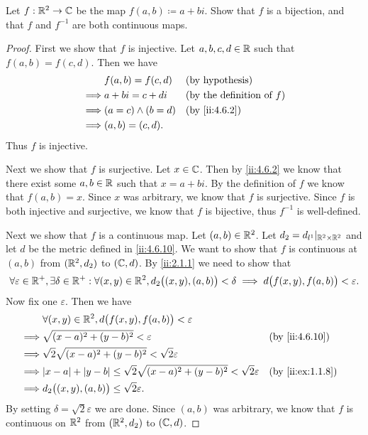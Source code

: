 \begin{ex}\label{ii:ex:4.6.11}
  Let \(f : \mathbb{R}^2 \to \mathbb{C}\) be the map \(f(a, b) \coloneqq a + bi\).
  Show that \(f\) is a bijection, and that \(f\) and \(f^{-1}\) are both continuous maps.
\end{ex}

\begin{proof}
  First we show that \(f\) is injective.
  Let \(a, b, c, d \in \mathbb{R}\) such that \(f(a, b) = f(c, d)\).
  Then we have
  \begin{align*}
             & f(a, b) = f(c, d)     &  & \text{(by hypothesis)}              \\
    \implies & a + bi = c + di       &  & \text{(by the definition of \(f\))} \\
    \implies & (a = c) \land (b = d) &  & \by{ii:4.6.2}                       \\
    \implies & (a, b) = (c, d).
  \end{align*}
  Thus \(f\) is injective.

  Next we show that \(f\) is surjective.
  Let \(x \in \mathbb{C}\).
  Then by \cref{ii:4.6.2} we know that there exist some \(a, b \in \mathbb{R}\) such that \(x = a + bi\).
  By the definition of \(f\) we know that \(f(a, b) = x\).
  Since \(x\) was arbitrary, we know that \(f\) is surjective.
  Since \(f\) is both injective and surjective, we know that \(f\) is bijective, thus \(f^{-1}\) is well-defined.

  Next we show that \(f\) is a continuous map.
  Let \((a, b) \in \mathbb{R}^2\).
  Let \(d_2 = d_{l^1}|_{\mathbb{R}^2 \times \mathbb{R}^2}\) and let \(d\) be the metric defined in \cref{ii:4.6.10}.
  We want to show that \(f\) is continuous at \((a, b)\) from \((\mathbb{R}^2, d_2)\) to \((\mathbb{C}, d)\).
  By \cref{ii:2.1.1} we need to show that
  \[
    \forall \varepsilon \in \mathbb{R}^+, \exists \delta \in \mathbb{R}^+ : \forall (x, y) \in \mathbb{R}^2, d_2\big((x, y), (a, b)\big) < \delta \implies d\big(f(x, y), f(a, b)\big) < \varepsilon.
  \]
  Now fix one \(\varepsilon\).
  Then we have
  \begin{align*}
             & \forall (x, y) \in \R^2, d\big(f(x, y), f(a, b)\big) < \varepsilon                                                \\
    \implies & \sqrt{(x - a)^2 + (y - b)^2} < \varepsilon                                                  &  & \by{ii:4.6.10}   \\
    \implies & \sqrt{2} \sqrt{(x - a)^2 + (y - b)^2} < \sqrt{2} \varepsilon                                                      \\
    \implies & \abs{x - a} + \abs{y - b} \leq \sqrt{2} \sqrt{(x - a)^2 + (y - b)^2} < \sqrt{2} \varepsilon &  & \by{ii:ex:1.1.8} \\
    \implies & d_2\big((x, y), (a, b)\big) \leq \sqrt{2} \varepsilon.
  \end{align*}
  By setting \(\delta = \sqrt{2} \varepsilon\) we are done.
  Since \((a, b)\) was arbitrary, we know that \(f\) is continuous on \(\mathbb{R}^2\) from \((\mathbb{R}^2, d_2)\) to \((\mathbb{C}, d)\).


\end{proof}
